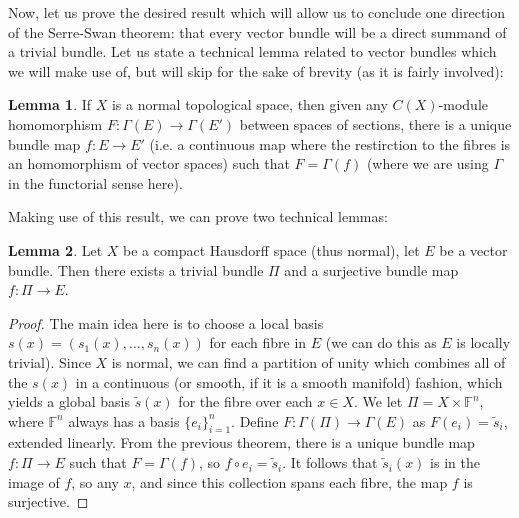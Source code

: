 \documentclass[aps,pra,showpacs,notitlepage,onecolumn,superscriptaddress,nofootinbib]{revtex4-1}
\theoremstyle{definition}
\newtheorem{lemma}{Lemma}[section]
\begin{document}
Now, let us prove the desired result which will allow us to conclude one direction of the Serre-Swan theorem: that every vector bundle will be a direct summand of a trivial bundle.
Let us state a technical lemma related to vector bundles which we will make use of, but will skip for the sake of brevity (as it is fairly involved):

\begin{lemma}
  If $X$ is a normal topological space, then given any $C(X)$-module homomorphism $F : \Gamma(E) \rightarrow \Gamma(E')$ between spaces of sections, there
  is a unique bundle map $f : E \rightarrow E'$ (i.e. a continuous map where the restirction to the fibres is an homomorphism of vector spaces) such that $F = \Gamma(f)$ (where
  we are using $\Gamma$ in the functorial sense here).
\end{lemma}

Making use of this result, we can prove two technical lemmas:

\begin{lemma}
  Let $X$ be a compact Hausdorff space (thus normal), let $E$ be a vector bundle. Then there exists a trivial bundle $\Pi$
  and a surjective bundle map $f : \Pi \rightarrow E$.
\end{lemma}

\begin{proof}
  The main idea here is to choose a local basis $s(x) = (s_1(x), \dots, s_n(x))$ for each fibre in $E$ (we can do this as $E$ is locally trivial). Since $X$ is normal,
  we can find a partition of unity which combines all of the $s(x)$ in a continuous (or smooth, if it is a smooth manifold) fashion, which yields a global
  basis $\widetilde{s}(x)$ for the fibre over each $x \in X$. We let $\Pi = X \times \mathbb{F}^n$, where $\mathbb{F}^n$ always has a basis $\{e_i\}_{i = 1}^{n}$. Define $F : \Gamma(\Pi) \rightarrow \Gamma(E)$
  as $F(e_i) = \widetilde{s}_i$, extended linearly. From the previous theorem, there is a unique bundle map $f : \Pi \rightarrow E$ such that $F = \Gamma(f)$, so $f \circ e_i = \widetilde{s}_i$.
  It follows that $\widetilde{s}_i(x)$ is in the image of $f$, so any $x$, and since this collection spans each fibre, the map $f$ is surjective.
  \end{proof}
\end{document}
